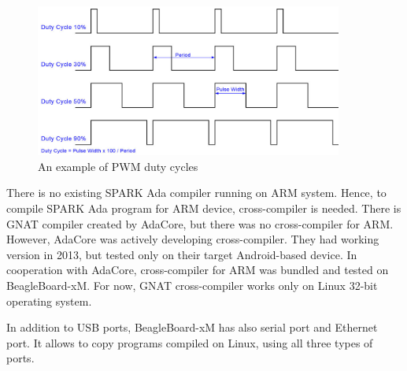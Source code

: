 \begin{figure}[ht]%
    \begin{center}
      \includegraphics[width=0.9\textwidth]{figures/pwm.png}      
    \end{center}
    \caption{An example of PWM duty cycles}
    \label{figure:pwm}
\end{figure}

There is no existing SPARK Ada compiler running on ARM system. Hence, to compile SPARK Ada program for ARM device, cross-compiler is needed. There is GNAT compiler \cite{Horn:Thesis} created by AdaCore, but there was no cross-compiler for ARM. However, AdaCore was actively developing cross-compiler. They had working version in 2013, but tested only on their target Android-based device. In cooperation with AdaCore, cross-compiler for ARM was bundled and tested on BeagleBoard-xM. For now, GNAT cross-compiler works only on Linux 32-bit operating system.

In addition to USB ports, BeagleBoard-xM has also serial port and Ethernet port. It allows to copy programs compiled on Linux, using all three types of ports. 
